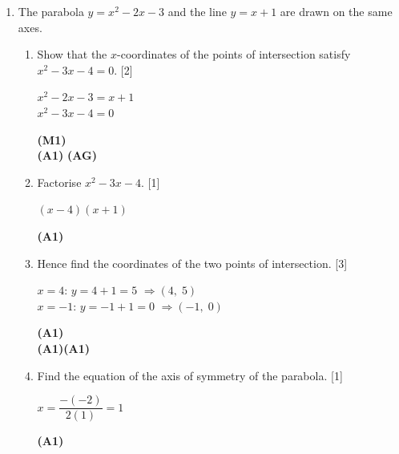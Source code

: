 \documentclass[12pt, twoside]{article}
\begin{document}
\begin{enumerate}[itemsep=0.2cm]
\newpage

\item The parabola $y = x^2 - 2x - 3$ and the line $y = x + 1$ are drawn
on the same axes.

\begin{enumerate}[itemsep=0.3cm]
  \item Show that the $x$-coordinates of the points of intersection satisfy\\
        $x^2 - 3x - 4 = 0$. \hfill [2]

  \begin{minipage}[t]{0.62\textwidth}
  $x^2 - 2x - 3 = x + 1$\\[0.15cm]
  $x^2 - 3x - 4 = 0$
  \end{minipage}%
  \begin{minipage}[t]{0.35\textwidth}\raggedleft
  \textbf{(M1)}\\[0.15cm]
  \textbf{(A1)} \textbf{(AG)}
  \end{minipage}

  \medskip
  \item Factorise $x^2 - 3x - 4$. \hfill [1]

  \begin{minipage}[t]{0.62\textwidth}
  $(x - 4)(x + 1)$
  \end{minipage}%
  \begin{minipage}[t]{0.35\textwidth}\raggedleft
  \textbf{(A1)}
  \end{minipage}

  \medskip
  \item Hence find the coordinates of the two points of intersection. \hfill [3]

  \begin{minipage}[t]{0.62\textwidth}
  $x = 4$: \quad $y = 4 + 1 = 5$ \quad $\Rightarrow (4,\; 5)$\\[0.15cm]
  $x = -1$: \quad $y = -1 + 1 = 0$ \quad $\Rightarrow (-1,\; 0)$
  \end{minipage}%
  \begin{minipage}[t]{0.35\textwidth}\raggedleft
  \textbf{(A1)}\\[0.15cm]
  \textbf{(A1)(A1)}
  \end{minipage}

  \medskip
  \item Find the equation of the axis of symmetry of the parabola. \hfill [1]

  \begin{minipage}[t]{0.62\textwidth}
  $x = \dfrac{-(-2)}{2(1)} = 1$
  \end{minipage}%
  \begin{minipage}[t]{0.35\textwidth}\raggedleft
  \textbf{(A1)}
  \end{minipage}


\end{enumerate}
\end{enumerate}
\end{document}
